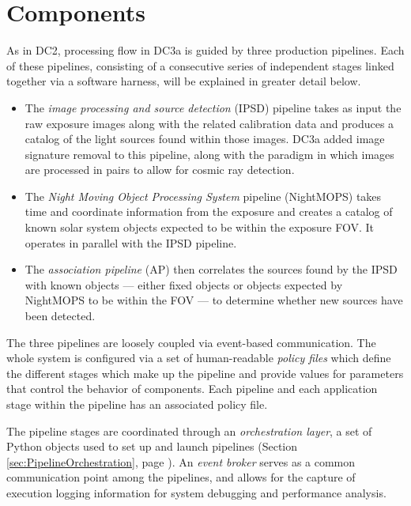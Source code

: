 
\section{Components}

As in DC2, processing flow in DC3a is guided by three production pipelines. Each of
these pipelines, consisting of a consecutive series of independent stages
linked together via a software harness, will be explained in greater detail below. 

\begin{itemize}

\item The \textit{image processing and source detection} (IPSD) pipeline takes 
as input the raw exposure images along with the related calibration data and 
produces a catalog of the light sources found within those images. DC3a added
image signature removal to this pipeline, along with the paradigm in which
images are processed in pairs to allow for cosmic ray detection.

\item The \textit{Night Moving Object Processing System} pipeline (NightMOPS) takes
time and coordinate information from the exposure and creates
a catalog of known solar system objects expected to be within
the exposure FOV. It operates in parallel with the IPSD pipeline.

\item The \textit{association pipeline} (AP) then correlates the sources found
by the IPSD with known objects --- either fixed objects or objects expected
by NightMOPS to be within the FOV --- to determine whether new sources
have been detected.

\end{itemize}

The three pipelines are loosely coupled via event-based communication. 
The whole system is configured via a set of 
human-readable \textit{policy files} which define the different stages which make 
up the pipeline and provide values for parameters that control the behavior of components.
Each pipeline and each application stage within the pipeline has an associated
policy file. 

The pipeline stages are coordinated through an \textit{orchestration layer},
a set of Python objects used to set up and launch pipelines (Section 
\ref{sec:PipelineOrchestration}, page \pageref{sec:PipelineOrchestration}).
An \textit{event broker} serves as a common communication
point among the pipelines, and allows for the capture of execution
logging information for system debugging and performance analysis. 

